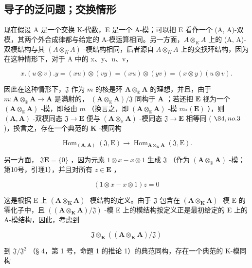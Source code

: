 \subsection{导子的泛问题；交换情形}

现在假设 A 是一个交换 K-代数，E 是一个 A-模；可以把 E 看作一个 (A, A)-双模，其两个外合成律都与给定的 A-模运算相同。另一方面，\(A \otimes_{K} A\) 上的 (A, A)-双模结构与其 \((A \otimes_{K} A)\) -模结构相同，后者源自 \(A \otimes_{K} A\) 上的交换环结构，因为在这种情形下，对于 A 中的 x、y、u、v，

\[
x. (u \otimes v). y = (x u) \otimes (v y) = (x u) \otimes (y v) = (x \otimes y) (u \otimes v).
\]

因此在这种情形下，\(\mathfrak{J}\) 作为 \(m\) 的核是环 \(\mathbf{A} \otimes_{\mathbb{K}} \mathbf{A}\) 的理想，并且，由于 \(m: \mathbf{A} \otimes_{\mathbb{K}} \mathbf{A} \to \mathbf{A}\) 是满射的， \((\mathbf{A} \otimes_{\mathbb{K}} \mathbf{A}) / \mathfrak{J}\) 同构于 \(\mathbf{A}\) ；若还把 \(\mathbf{E}\) 视为一个 \((\mathbf{A} \otimes_{\mathbb{K}} \mathbf{A})\) -模，即经由 \(m\) （换言之，即 \((\mathbf{A} \otimes_{\mathbb{K}} \mathbf{A})\) -模 \(m_*(\mathbf{E})\) ），则 \((\mathbf{A}, \mathbf{A})\) -双模同态 \(\mathfrak{J} \to \mathbf{E}\) 便与 \((\mathbf{A} \otimes_{\mathbb{K}} \mathbf{A})\) -模同态 \(\mathfrak{J} \to \mathbf{E}\) 相等同 ( \(\S 4, no. 3\) )，换言之，存在一个典范的 \(\mathbf{K}\) -模同构

\[
\operatorname{Hom} _ {(\mathbf {A}, \mathbf {A})} (\mathfrak{J} , \mathrm{E}) \rightarrow \operatorname{Hom} _ {\mathbf {A} \otimes_ {\mathbf {K}} \mathbf {A}} (\mathfrak{J} , \mathrm{E}).
\]

另一方面， \(\mathfrak{J}\mathbf{E} = \{0\}\) ，因为元素 \(1 \otimes x - x \otimes 1\) 生成 \(\mathfrak{J}\) （作为 \((\mathbf{A} \otimes_{\mathbb{K}} \mathbf{A})\) -模；第10号，引理1），并且对所有 \(z \in \mathbf{E}\) ，

\[
(1 \otimes x - x \otimes 1) z = 0
\]

这是根据 E 上 \((\mathbf{A} \otimes_{\mathbf{K}} \mathbf{A})\) -模结构的定义。由于 \(\mathfrak{J}\) 包含在 \((\mathbf{A} \otimes_{\mathbf{K}} \mathbf{A})\) -模 E 的零化子中，且 \(((\mathbf{A} \otimes_{\mathbf{K}} \mathbf{A})/\mathfrak{J})\) -模 E 上的模结构按定义正是最初给定的 E 上的 A-模结构，因此，考虑到

\[
\mathfrak{J} \otimes_ {\mathbf {K}} ((\mathbf {A} \otimes_ {\mathbf {K}} \mathbf {A}) / \mathfrak{J})
\]

到 \(\mathfrak{J} / \mathfrak{J}^2\) （§ 4，第 1 号，命题 1 的推论 1）的典范同构，存在一个典范的 K-模同构

